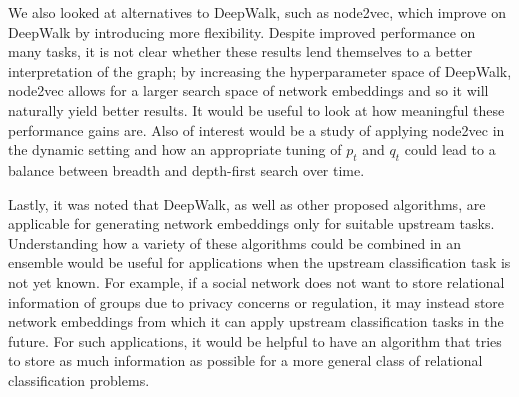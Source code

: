 \documentclass[a4paper]{article}
\begin{document}
We also looked at alternatives to DeepWalk, such as node2vec, which improve on DeepWalk by introducing more flexibility. Despite improved performance on many tasks, it is not clear whether these results lend themselves to a better interpretation of the graph; by increasing the hyperparameter space of DeepWalk, node2vec allows for a larger search space of network embeddings and so it will naturally yield better results.
It would be useful to look at how meaningful these performance gains are. Also of interest would be a study of applying node2vec in the dynamic setting and how an appropriate tuning of $p_t$ and $q_t$ could lead to a balance between breadth and depth-first search over time.

Lastly, it was noted that DeepWalk, as well as other proposed algorithms, are applicable for generating network embeddings only for suitable upstream tasks. Understanding how a variety of these algorithms could be combined in an ensemble would be useful for applications when the upstream classification task is not yet known. For example, if a social network
does not want to store relational information of groups due to privacy concerns or regulation, it may instead store network embeddings from which it can apply upstream classification tasks in the future. For such applications, it would be helpful to have an algorithm that tries to store as much information as possible for a more general class of relational classification problems.






\printindex
\end{document}
